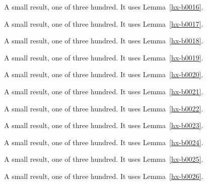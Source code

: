 \begin{lemma}[Bulk 17]\label{hx-b0017}
A small result, one of three hundred. It uses Lemma~\ref{hx-b0016}.
\end{lemma}

\begin{lemma}[Bulk 18]\label{hx-b0018}
A small result, one of three hundred. It uses Lemma~\ref{hx-b0017}.
\end{lemma}

\begin{lemma}[Bulk 19]\label{hx-b0019}
A small result, one of three hundred. It uses Lemma~\ref{hx-b0018}.
\end{lemma}

\begin{lemma}[Bulk 20]\label{hx-b0020}
A small result, one of three hundred. It uses Lemma~\ref{hx-b0019}.
\end{lemma}

\begin{lemma}[Bulk 21]\label{hx-b0021}
A small result, one of three hundred. It uses Lemma~\ref{hx-b0020}.
\end{lemma}

\begin{lemma}[Bulk 22]\label{hx-b0022}
A small result, one of three hundred. It uses Lemma~\ref{hx-b0021}.
\end{lemma}

\begin{lemma}[Bulk 23]\label{hx-b0023}
A small result, one of three hundred. It uses Lemma~\ref{hx-b0022}.
\end{lemma}

\begin{lemma}[Bulk 24]\label{hx-b0024}
A small result, one of three hundred. It uses Lemma~\ref{hx-b0023}.
\end{lemma}

\begin{lemma}[Bulk 25]\label{hx-b0025}
A small result, one of three hundred. It uses Lemma~\ref{hx-b0024}.
\end{lemma}

\begin{lemma}[Bulk 26]\label{hx-b0026}
A small result, one of three hundred. It uses Lemma~\ref{hx-b0025}.
\end{lemma}

\begin{lemma}[Bulk 27]\label{hx-b0027}
A small result, one of three hundred. It uses Lemma~\ref{hx-b0026}.
\end{lemma}

